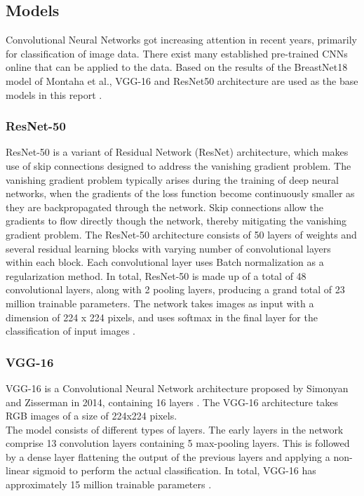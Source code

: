 \documentclass[sn-mathphys,Numbered]{sn-jnl}%
\theoremstyle{thmstyleone}%
\theoremstyle{thmstyletwo}%
\theoremstyle{thmstylethree}%
\begin{document}
\subsection{Models}
\label{Models}
Convolutional Neural Networks got increasing attention in recent years, primarily for classification of image data. There exist many established pre-trained CNNs online that can be applied to the data. Based on the results of the BreastNet18 model of Montaha et al., VGG-16 and ResNet50 architecture are used as the base models in this report \cite{Montaha_2021}.
\subsubsection{ResNet-50}
\label{ResNet}
ResNet-50 is a variant of Residual Network (ResNet) architecture, which makes use of skip connections designed to address the vanishing gradient problem. The vanishing gradient problem typically arises during the training of deep neural networks, when the gradients of the loss function become continuously smaller as they are backpropagated through the network. Skip connections allow the gradients  to flow directly though the network, thereby mitigating the vanishing gradient problem. The ResNet-50 architecture consists of 50 layers of weights and several residual learning blocks with varying number of convolutional layers within each block. Each convolutional layer uses Batch normalization as a regularization method. In total, ResNet-50 is made up of a total of  48 convolutional layers, along with 2 pooling layers, producing a grand total of 23 million trainable parameters. The network takes images as input with a dimension of 224 x 224 pixels, and uses softmax in the final layer for the classification of input images \cite{he2015deep}.
\subsubsection{VGG-16}
\label{VGG-16}
VGG-16 is a Convolutional Neural Network architecture proposed by Simonyan and Zisserman in 2014, containing 16 layers \cite{Alzubaidi_2021}.
The VGG-16 architecture takes RGB images of a size of 224x224 pixels.\\
The model consists of different types of layers. The early layers in the network comprise 13 convolution layers containing 5 max-pooling layers.
This is followed by a dense layer flattening the output of the previous layers and applying a non-linear sigmoid to perform the actual classification. In total, VGG-16 has approximately 15 million trainable parameters \cite{Rahdika_2020}.
\end{document}
